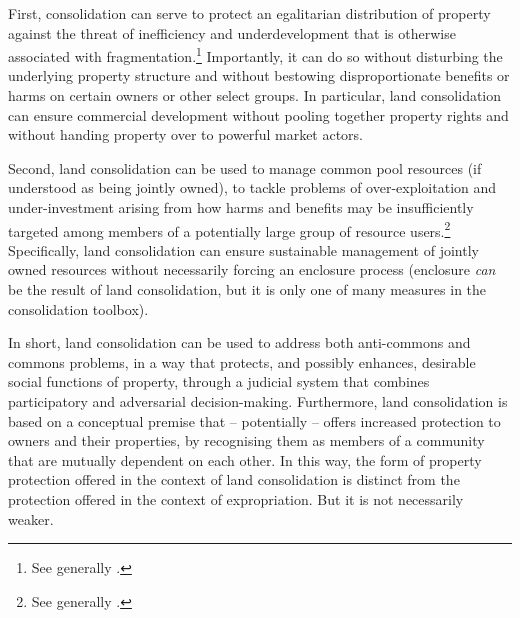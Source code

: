 First, consolidation can serve to protect an egalitarian distribution of property against the threat of inefficiency and underdevelopment that is otherwise associated with fragmentation.\footnote{See generally \cite{heller98}.} Importantly, it can do so without disturbing the underlying property structure and without bestowing disproportionate benefits or harms on certain owners or other select groups. In particular, land consolidation can ensure commercial development without pooling together property rights and without handing property over to powerful market actors. 

Second, land consolidation can be used to manage common pool resources (if understood as being jointly owned), to tackle problems of over-exploitation and under-investment arising from how harms and benefits may be insufficiently targeted among members of a potentially large group of resource users.\footnote{See generally \cite{hardin68,demsetz67}.} Specifically, land consolidation can ensure sustainable management of jointly owned resources without necessarily forcing an enclosure process (enclosure {\it can} be the result of land consolidation, but it is only one of many measures in the consolidation toolbox).

In short, land consolidation can be used to address both anti-commons and commons problems, in a way that protects, and possibly enhances, desirable social functions of property, through a judicial system that combines participatory and adversarial decision-making. Furthermore, land consolidation is based on a conceptual premise that -- potentially -- offers increased protection to owners and their properties, by recognising them as members of a community that are mutually dependent on each other. In this way, the form of property protection offered in the context of land consolidation is distinct from the protection offered in the context of expropriation. But it is not necessarily weaker.


